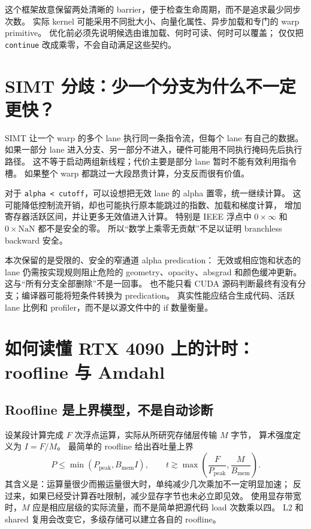 这个框架故意保留两处清晰的 barrier，便于检查生命周期，而不是追求最少同步次数。
实际 kernel 可能采用不同批大小、向量化属性、异步加载和专门的 warp primitive。
优化前必须先说明候选由谁加载、何时可读、何时可以覆盖；
仅仅把 \texttt{continue} 改成乘零，不会自动满足这些契约。

\section{SIMT 分歧：少一个分支为什么不一定更快？}

SIMT 让一个 warp 的多个 lane 执行同一条指令流，但每个 lane 有自己的数据。
如果一部分 lane 进入分支、另一部分不进入，硬件可能用不同执行掩码先后执行路径。
这不等于启动两组新线程；代价主要是部分 lane 暂时不能有效利用指令槽。
如果整个 warp 都跳过一大段昂贵计算，分支反而很有价值。

对于 \texttt{alpha < cutoff}，可以设想把无效 lane 的 alpha 置零，统一继续计算。
这可能降低控制流开销，却也可能执行原本能跳过的指数、加载和梯度计算，
增加寄存器活跃区间，并让更多无效值进入计算。
特别是 IEEE 浮点中 $0\times\infty$ 和 $0\times\mathrm{NaN}$ 都不是安全的零。
所以“数学上乘零无贡献”不足以证明 branchless backward 安全。

本次保留的是受限的、安全的窄通道 alpha predication：
无效或相应饱和状态的 lane 仍需按实现规则阻止危险的 geometry、opacity、absgrad 和颜色缓冲更新。
这与“所有分支全部删除”不是一回事。
也不能只看 CUDA 源码判断最终有没有分支；编译器可能将短条件转换为 predication。
真实性能应结合生成代码、活跃 lane 比例和 profiler，而不是以源文件中的 if 数量衡量。

\section{如何读懂 RTX 4090 上的计时：roofline 与 Amdahl}

\subsection{Roofline 是上界模型，不是自动诊断}

设某段计算完成 $F$ 次浮点运算，实际从所研究存储层传输 $M$ 字节，
算术强度定义为 $I=F/M$。
最简单的 roofline 给出吞吐量上界
\begin{equation}
 P\leq\min(P_{\mathrm{peak}},B_{\mathrm{mem}}I),
 \qquad
 t\gtrsim\max\left(\frac{F}{P_{\mathrm{peak}}},
                       \frac{M}{B_{\mathrm{mem}}}\right).
\end{equation}
其含义是：运算量很少而搬运量很大时，单纯减少几次乘加不一定明显加速；
反过来，如果已经受计算吞吐限制，减少显存字节也未必立即见效。
使用显存带宽时，$M$ 应是相应层级的实际流量，而不是简单把源代码 load 次数乘以四。
L2 和 shared 复用会改变它，多级存储可以建立各自的 roofline。

